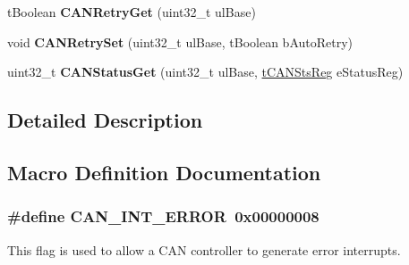 \begin{DoxyCompactItemize}
\item 
t\+Boolean {\bfseries C\+A\+N\+Retry\+Get} (uint32\+\_\+t ul\+Base)\hypertarget{group__can__api_ga3ccc30ee3dcf3fdc531b68d9bde87836}{}\label{group__can__api_ga3ccc30ee3dcf3fdc531b68d9bde87836}

\item 
void {\bfseries C\+A\+N\+Retry\+Set} (uint32\+\_\+t ul\+Base, t\+Boolean b\+Auto\+Retry)\hypertarget{group__can__api_gad48198463ffd855e63ccefbc4ab85109}{}\label{group__can__api_gad48198463ffd855e63ccefbc4ab85109}

\item 
uint32\+\_\+t {\bfseries C\+A\+N\+Status\+Get} (uint32\+\_\+t ul\+Base, \hyperlink{group__can__api_gad898b7c10eb4d9282bd4c25fc935b3d2}{t\+C\+A\+N\+Sts\+Reg} e\+Status\+Reg)\hypertarget{group__can__api_ga4ff66fe06bc5bcfe7fadad84655cb118}{}\label{group__can__api_ga4ff66fe06bc5bcfe7fadad84655cb118}

\end{DoxyCompactItemize}


\subsection{Detailed Description}


\subsection{Macro Definition Documentation}
\subsubsection[{\texorpdfstring{C\+A\+N\+\_\+\+I\+N\+T\+\_\+\+E\+R\+R\+OR}{CAN_INT_ERROR}}]{\setlength{\rightskip}{0pt plus 5cm}\#define C\+A\+N\+\_\+\+I\+N\+T\+\_\+\+E\+R\+R\+OR~0x00000008}\hypertarget{group__can__api_gaaeedfcc6f76b6f3edc4e389eb66969a7}{}\label{group__can__api_gaaeedfcc6f76b6f3edc4e389eb66969a7}
This flag is used to allow a C\+AN controller to generate error interrupts. 

